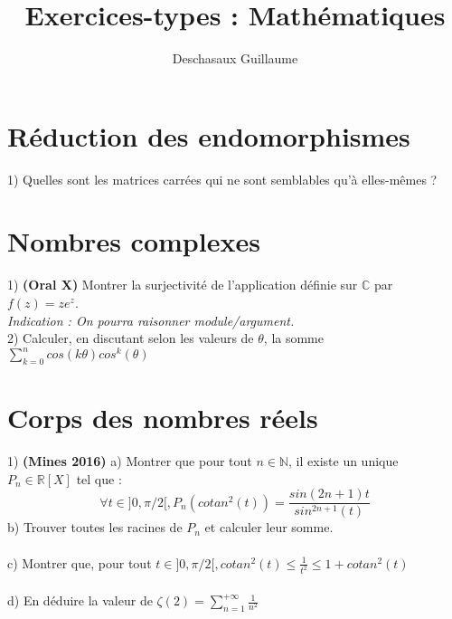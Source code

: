 \documentclass{article}
\newcommand{\N}{\mathbb{N}}   %
\newcommand{\R}{\mathbb{R}}   %
\newcommand{\C}{\mathbb{C}}   %
\begin{document}
\title{\textbf{Exercices-types : Mathématiques}}
\author{Deschasaux Guillaume}
\date{}
\maketitle

\tableofcontents

\section{Réduction des endomorphismes}

1) Quelles sont les matrices carrées qui ne sont semblables qu'à elles-mêmes ? \\


\section{Nombres complexes}

1) \textbf{(Oral X)} Montrer la surjectivité de l'application définie sur $\C$ par $f(z)=ze^z$. \\
\textit{Indication : On pourra raisonner module/argument.} \\

2) Calculer, en discutant selon les valeurs de $\theta$, la somme $\sum_{k=0}^n cos(k\theta)cos^k(\theta)$ \\

\section{Corps des nombres réels}

1) \textbf{(Mines 2016)} a) Montrer que pour tout $n \in \N$, il existe un unique $P_n \in \R[X]$ tel que :
\begin{equation}
\forall t \in ]0,\pi/2[, P_n(cotan^2(t))=\frac{sin(2n+1)t}{sin^{2n+1}(t)}
\end{equation}
b) Trouver toutes les racines de $P_n$ et calculer leur somme. \\\\
c) Montrer que, pour tout $t \in ]0,\pi/2[, cotan^2(t) \leq \frac{1}{t^2} \leq 1+ cotan^2(t)$ \\\\
d) En déduire la valeur de $\zeta(2)=\sum_{n=1}^{+\infty} \frac{1}{n^2}$ \\\\
\end{document}
